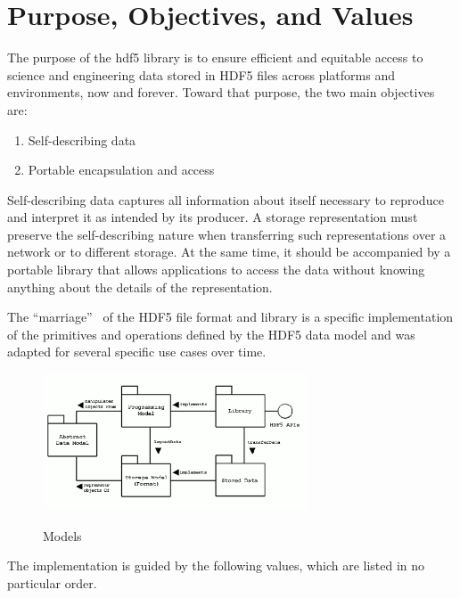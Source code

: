 \section{Purpose, Objectives, and Values}

The purpose of the \acrshort{hdf5} library is to ensure efficient and equitable access to science and engineering data stored in HDF5 files across platforms and environments, now and forever. Toward that purpose, the two main objectives are:

\begin{enumerate}
    \item Self-describing data
    \item Portable encapsulation and access
\end{enumerate}

Self-describing data captures all information about itself necessary to reproduce and interpret it as intended by its producer. A storage representation must preserve the self-describing nature when transferring such representations over a network or to different storage. At the same time, it should be accompanied by a portable library that allows applications to access the data without knowing anything about the details of the representation.

The ``marriage''~\cite{kuehn1996} of the HDF5 file format and library is a specific implementation of the primitives and operations defined by the HDF5 data model and was adapted for several specific use cases over time.

\begin{figure}[ht]
\centering
\includegraphics[width=0.7\textwidth]{images/models.png}
\label{fig:img1}
\caption{Models}
\end{figure}

The implementation is guided by the following values, which are listed in no particular order.

